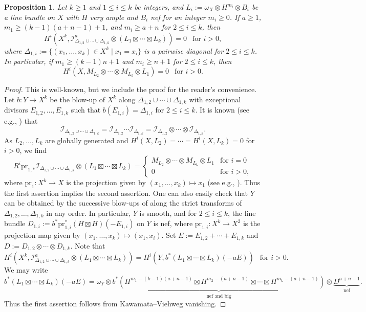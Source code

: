 \documentclass{amsart}
\theoremstyle{plain}
\newtheorem{prop}[thm]{Proposition}
\theoremstyle{definition}
\theoremstyle{remark}
\newcommand{\pr}{\textrm{pr}}
\begin{document}
\begin{prop}\label{prop:cohvanA}
Let $k \geq 1$ and $1 \leq i \leq k$ be integers, and $L_i:=\omega_X \otimes H^{m_i} \otimes B_i$ be a line bundle on $X$ with $H$ very ample and $B_i$ nef for an integer $m_i \geq 0$. If $a \geq 1$, $m_1 \geq (k-1)(a+n-1)+1$, and $m_i \geq a+n$ for $2 \leq i \leq k$, then  
$$
H^i(X^k, \mathscr{I}_{\Delta_{1,2} \cup \cdots \cup \Delta_{1,k}}^a \otimes (L_1 \boxtimes \cdots \boxtimes L_k))=0~~\text{ for $i > 0$},
$$
where $\Delta_{1,i}:=\{ (x_1, \ldots, x_k) \in X^k \mid x_1 = x_i\}$ is a pairwise diagonal for $2 \leq i \leq k$. In particular, if $m_1 \geq (k-1)n+1$ and $m_i \geq n+1$ for $2 \leq i \leq k$, then
$$
H^i(X, M_{L_2} \otimes \cdots \otimes M_{L_k} \otimes L_1) = 0~~\text{ for $i>0$}. 
$$
\end{prop}

\begin{proof}
This is well-known, but we include the proof for the reader's convenience. 
Let $b \colon Y \to X^k$ be the blow-up of $X^k$ along $\Delta_{1,2} \cup \cdots \cup \Delta_{1,k}$ with exceptional divisors $E_{1,2}, \ldots, E_{1,k}$ such that $b(E_{1,i})=\Delta_{1,i}$ for $2 \leq i \leq k$. 
It is known (see e.g., \cite[Corollary 3.5]{BL2025}) that
$$
\mathscr{I}_{\Delta_{1,2} \cup \cdots \cup \Delta_{1,k}} 
= \mathscr{I}_{\Delta_{1,2}} \cdots \mathscr{I}_{\Delta_{1,k}} 
= \mathscr{I}_{\Delta_{1,2}} \otimes \cdots \otimes \mathscr{I}_{\Delta_{1,k}}.
$$
As $L_2, \ldots, L_k$ are globally generated and $H^i(X, L_2) = \cdots = H^i(X, L_k)=0$ for $i>0$, we find
$$
R^i \pr_{1,*}  \mathscr{I}_{\Delta_{1,2} \cup \cdots \cup \Delta_{1,k}} \otimes (L_1 \boxtimes \cdots \boxtimes L_k) = \begin{cases} M_{L_2} \otimes \cdots \otimes M_{L_k} \otimes L_1 & \text{for $i=0$} \\ 0 & \text{for $i>0$}, \end{cases}
$$
where $\pr_1 \colon X^k \to X$ is the projection given by $(x_1, \ldots, x_k) \mapsto x_1$ (see e.g., \cite[Theorem 3.6]{BL2025}). 
Thus the first assertion implies the second assertion. 
One can also easily check that $Y$ can be obtained by the successive blow-ups of along the strict transforms of $\Delta_{1,2}, \ldots, \Delta_{1,k}$ in any order. In particular, $Y$ is smooth, and for $2 \leq i \leq k$, the line bundle $D_{1,i}:=b^* \pr_{1,i}^* (H \boxtimes H) (-E_{1,i})$ on $Y$ is nef, where $\pr_{1,i} \colon X^k \to X^2$ is the projection map given by $(x_1, \ldots, x_k) \mapsto (x_1, x_i)$. Set $E:=E_{1,2} + \cdots + E_{1,k}$ and $D:=D_{1,2} \otimes \cdots \otimes D_{1,k}$. 
Note that
$$
H^i(X^k, \mathscr{I}_{\Delta_{1,2} \cup \cdots \cup \Delta_{1,k}}^a \otimes (L_1 \boxtimes \cdots \boxtimes L_k)) = H^i(Y, b^*(L_1 \boxtimes \cdots \boxtimes L_k)(-aE))~~\text{ for $i>0$}.
$$
We may write
$$
b^*(L_1 \boxtimes \cdots \boxtimes L_k)(-aE)= \omega_Y \otimes \underbrace{b^*(H^{m_1 - (k-1)(a+n-1)} \boxtimes H^{m_2 - (a+n-1)} \boxtimes \cdots \boxtimes H^{m_k-(a+n-1)})}_{\text{nef and big}} \otimes \underbrace{D^{a+n-1}}_{\text{nef}}.
$$
Thus the first assertion follows from Kawamata--Viehweg vanishing. 
\end{proof}
\end{document}
